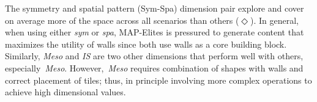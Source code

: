 

The symmetry and spatial pattern (Sym-Spa) dimension pair explore and cover on average more of the space across all scenarios than others ($\Diamond$). In general, when using either \textit{sym} or \textit{spa}, MAP-Elites is pressured to generate content that maximizes the utility of walls since both use walls as a core building block. Similarly, \textit{Meso} and \textit{IS} are two other dimensions that perform well with others, especially~\textit{Meso}. However,~\textit{Meso} requires combination of shapes with walls and correct placement of tiles; thus, in principle involving more complex operations to achieve high dimensional values. %

 


